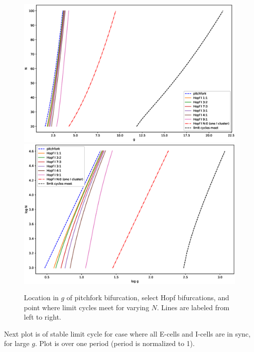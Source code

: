 \documentclass[11pt,reqno]{amsart}
\begin{document}
\begin{figure}[H]
    \centering
    \includegraphics[width=15cm]{images/noclustersNvsg.eps}
    \includegraphics[width=15cm]{images/noclusterslogNvslogg.eps}
    \caption{Location in $g$ of pitchfork bifurcation, select Hopf bifurcations, and point where limit cycles meet for varying $N$. Lines are labeled from left to right.}
    \label{fig:periodvsg}
\end{figure}


Next plot is of stable limit cycle for case where all E-cells and I-cells are in sync, for large $g$. Plot is over one period (period is normalized to 1).
\end{document}
